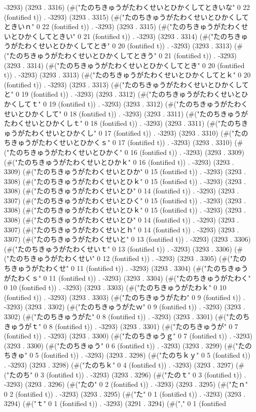 -3293) (3293 . 3316) (#("たのちきゅうがたわくせいとひかくしてときいな" 0 22 (fontified t)) . -3293) (3293 . 3315) (#("たのちきゅうがたわくせいとひかくしてときいｎ" 0 22 (fontified t)) . -3293) (3293 . 3315) (#("たのちきゅうがたわくせいとひかくしてときい" 0 21 (fontified t)) . -3293) (3293 . 3314) (#("たのちきゅうがたわくせいとひかくしてとき" 0 20 (fontified t)) . -3293) (3293 . 3313) (#("たのちきゅうがたわくせいとひかくしてときう" 0 21 (fontified t)) . -3293) (3293 . 3314) (#("たのちきゅうがたわくせいとひかくしてとき" 0 20 (fontified t)) . -3293) (3293 . 3313) (#("たのちきゅうがたわくせいとひかくしてとｋ" 0 20 (fontified t)) . -3293) (3293 . 3313) (#("たのちきゅうがたわくせいとひかくしてと" 0 19 (fontified t)) . -3293) (3293 . 3312) (#("たのちきゅうがたわくせいとひかくしてｔ" 0 19 (fontified t)) . -3293) (3293 . 3312) (#("たのちきゅうがたわくせいとひかくして" 0 18 (fontified t)) . -3293) (3293 . 3311) (#("たのちきゅうがたわくせいとひかくしｔ" 0 18 (fontified t)) . -3293) (3293 . 3311) (#("たのちきゅうがたわくせいとひかくし" 0 17 (fontified t)) . -3293) (3293 . 3310) (#("たのちきゅうがたわくせいとひかくｓ" 0 17 (fontified t)) . -3293) (3293 . 3310) (#("たのちきゅうがたわくせいとひかく" 0 16 (fontified t)) . -3293) (3293 . 3309) (#("たのちきゅうがたわくせいとひかｋ" 0 16 (fontified t)) . -3293) (3293 . 3309) (#("たのちきゅうがたわくせいとひか" 0 15 (fontified t)) . -3293) (3293 . 3308) (#("たのちきゅうがたわくせいとひｋ" 0 15 (fontified t)) . -3293) (3293 . 3308) (#("たのちきゅうがたわくせいとひ" 0 14 (fontified t)) . -3293) (3293 . 3307) (#("たのちきゅうがたわくせいとひく" 0 15 (fontified t)) . -3293) (3293 . 3308) (#("たのちきゅうがたわくせいとひｋ" 0 15 (fontified t)) . -3293) (3293 . 3308) (#("たのちきゅうがたわくせいとひ" 0 14 (fontified t)) . -3293) (3293 . 3307) (#("たのちきゅうがたわくせいとｈ" 0 14 (fontified t)) . -3293) (3293 . 3307) (#("たのちきゅうがたわくせいと" 0 13 (fontified t)) . -3293) (3293 . 3306) (#("たのちきゅうがたわくせいｔ" 0 13 (fontified t)) . -3293) (3293 . 3306) (#("たのちきゅうがたわくせい" 0 12 (fontified t)) . -3293) (3293 . 3305) (#("たのちきゅうがたわくせ" 0 11 (fontified t)) . -3293) (3293 . 3304) (#("たのちきゅうがたわくｓ" 0 11 (fontified t)) . -3293) (3293 . 3304) (#("たのちきゅうがたわく" 0 10 (fontified t)) . -3293) (3293 . 3303) (#("たのちきゅうがたわｋ" 0 10 (fontified t)) . -3293) (3293 . 3303) (#("たのちきゅうがたわ" 0 9 (fontified t)) . -3293) (3293 . 3302) (#("たのちきゅうがたｗ" 0 9 (fontified t)) . -3293) (3293 . 3302) (#("たのちきゅうがた" 0 8 (fontified t)) . -3293) (3293 . 3301) (#("たのちきゅうがｔ" 0 8 (fontified t)) . -3293) (3293 . 3301) (#("たのちきゅうが" 0 7 (fontified t)) . -3293) (3293 . 3300) (#("たのちきゅうｇ" 0 7 (fontified t)) . -3293) (3293 . 3300) (#("たのちきゅう" 0 6 (fontified t)) . -3293) (3293 . 3299) (#("たのちきゅ" 0 5 (fontified t)) . -3293) (3293 . 3298) (#("たのちｋｙ" 0 5 (fontified t)) . -3293) (3293 . 3298) (#("たのちｋ" 0 4 (fontified t)) . -3293) (3293 . 3297) (#("たのち" 0 3 (fontified t)) . -3293) (3293 . 3296) (#("たのｔ" 0 3 (fontified t)) . -3293) (3293 . 3296) (#("たの" 0 2 (fontified t)) . -3293) (3293 . 3295) (#("たｎ" 0 2 (fontified t)) . -3293) (3293 . 3295) (#("た" 0 1 (fontified t)) . -3293) (3293 . 3294) (#("ｔ" 0 1 (fontified t)) . -3293) (3291 . 3294) (#("," 0 1 (fontified 
